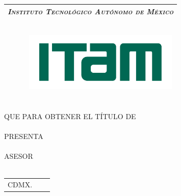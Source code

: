 \thispagestyle{empty}
\begin{titlepage}
	\begin{center}
	\vspace{70pt}
		\begin{tabular}{c}
			\Large \emph{\textsc{
				Instituto Tecnológico Autónomo de México
				}
			}\\
			\hline
		\end{tabular}\\
		\vspace{25pt}
		\includegraphics[width=10cm,height=2.8cm]{Figures/logo-ITAM_new.png}\\
		\vspace{25pt}
		{\huge \thetitle}\\
		\vspace{5pt}
		\vspace{20 pt}
		{\Large \thethesis } \\
		\vspace{5pt}
		QUE PARA OBTENER EL TÍTULO DE \\
		\vspace{5pt}
		{\Large \thedegree} \\
		\vspace{5pt}
		PRESENTA \\
		\vspace{5pt}
		{\Large \theauthor} \\
		\vfill
		ASESOR \\
		{\Large \theadvisor} \\
		\vspace{5pt}
		\begin{tabular}{lcr}
			CDMX. & \hspace{60pt} & \theyear
		\end{tabular}
	\end{center}
\end{titlepage}